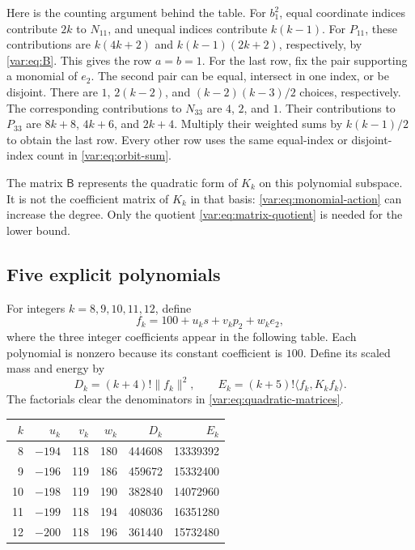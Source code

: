 \documentclass[11pt]{article}
\newcommand{\ip}[2]{\langle #1,#2\rangle}
\newcommand{\norm}[1]{\lVert #1\rVert}
\begin{document}
Here is the counting argument behind the table.
For $b_1^2$, equal coordinate indices contribute $2k$ to $N_{11}$,
and unequal indices contribute $k(k-1)$.
For $P_{11}$, these contributions are $k(4k+2)$ and
$k(k-1)(2k+2)$, respectively, by \eqref{var:eq:B}.
This gives the row $a=b=1$.
For the last row, fix the pair supporting a monomial of $e_2$.
The second pair can be equal, intersect in one index, or be disjoint.
There are $1$, $2(k-2)$, and $(k-2)(k-3)/2$ choices, respectively.
The corresponding contributions to $N_{33}$ are $4$, $2$, and $1$.
Their contributions to $P_{33}$ are $8k+8$, $4k+6$, and $2k+4$.
Multiply their weighted sums by $k(k-1)/2$ to obtain the last row.
Every other row uses the same equal-index or disjoint-index count in
\eqref{var:eq:orbit-sum}.

The matrix $\mathsf B$ represents the quadratic form of $K_k$ on this
polynomial subspace.  It is not the coefficient matrix of $K_k$ in
that basis: \eqref{var:eq:monomial-action} can increase the degree.
Only the quotient \eqref{var:eq:matrix-quotient} is needed for the lower bound.

\subsection{Five explicit polynomials}

For integers $k=8,9,10,11,12$, define
\begin{equation}\label{var:eq:trials}
 f_k=100+u_ks+v_kp_2+w_ke_2,
\end{equation}
where the three integer coefficients appear in the following table.
Each polynomial is nonzero because its constant coefficient is $100$.
Define its scaled mass and energy by
\begin{equation}\label{var:eq:scaled}
 D_k=(k+4)!\norm{f_k}^2,\qquad
 E_k=(k+5)!\ip{f_k}{K_kf_k}.
\end{equation}
The factorials clear the denominators in \eqref{var:eq:quadratic-matrices}.
\begin{center}
\begin{tabular}{rrrrrr}
\toprule
$k$&$u_k$&$v_k$&$w_k$&$D_k$&$E_k$\\
\midrule
8&$-194$&118&180&444608&13339392\\
9&$-196$&119&186&459672&15332400\\
10&$-198$&119&190&382840&14072960\\
11&$-199$&118&194&408036&16351280\\
12&$-200$&118&196&361440&15732480\\
\bottomrule
\end{tabular}
\end{center}
\end{document}
